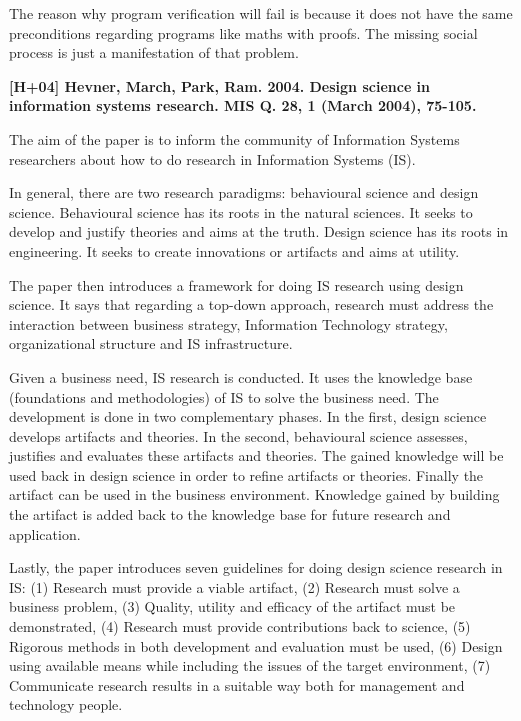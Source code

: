 \documentclass[a4paper,12pt]{scrartcl}
\newcommand{\papertitle}[2]{
	\noindent
	\textbf{\textsf{{\large
		[#1] #2
	}}}
	\vspace{2mm}
}
\begin{document}
The reason why program verification will fail is because it does not have the
same preconditions regarding programs like maths with proofs. The missing social
process is just a manifestation of that problem.

\vspace{8mm}

\papertitle{H+04}{Hevner, March, Park, Ram. 2004. Design science in information
				  systems research. MIS Q. 28, 1 (March 2004), 75-105.}

The aim of the paper is to inform the community of Information Systems
researchers about how to do research in Information Systems (IS).

In general, there are two research paradigms: behavioural science and design
science. Behavioural science has its roots in the natural sciences. It seeks to
develop and justify theories and aims at the truth. Design science has its roots
in engineering. It seeks to create innovations or artifacts and aims at utility.

The paper then introduces a framework for doing IS research using design
science. It says that regarding a top-down approach, research must address the
interaction between business strategy, Information Technology strategy,
organizational structure and IS infrastructure.

Given a business need, IS research is conducted. It uses the knowledge base
(foundations and methodologies) of IS to solve the business need. The
development is done in two complementary phases. In the first, design science
develops artifacts and theories. In the second, behavioural science assesses,
justifies and evaluates these artifacts and theories. The gained knowledge will
be used back in design science in order to refine artifacts or theories. Finally
the artifact can be used in the business environment. Knowledge gained by
building the artifact is added back to the knowledge base for future research
and application.

Lastly, the paper introduces seven guidelines for doing design science research
in IS: (1) Research must provide a viable artifact, (2) Research must solve a
business problem, (3) Quality, utility and efficacy of the artifact must be
demonstrated, (4) Research must provide contributions back to science,
(5) Rigorous methods in both development and evaluation must be used, (6) Design
using available means while including the issues of the target environment,
(7) Communicate research results in a suitable way both for management and
technology people.
\end{document}
